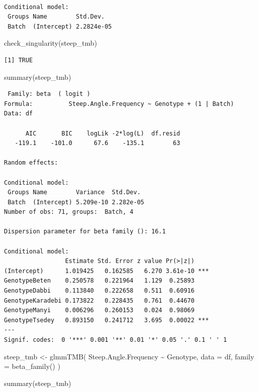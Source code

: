 \documentclass[
  letterpaper,
  DIV=11,
  numbers=noendperiod]{scrartcl}
\newenvironment{Shaded}{\begin{snugshade}}{\end{snugshade}}
\newcommand{\AttributeTok}[1]{\textcolor[rgb]{0.40,0.45,0.13}{#1}}
\newcommand{\FunctionTok}[1]{\textcolor[rgb]{0.28,0.35,0.67}{#1}}
\newcommand{\NormalTok}[1]{\textcolor[rgb]{0.00,0.23,0.31}{#1}}
\newcommand{\OtherTok}[1]{\textcolor[rgb]{0.00,0.23,0.31}{#1}}
\newcommand{\SpecialCharTok}[1]{\textcolor[rgb]{0.37,0.37,0.37}{#1}}
\begin{document}
\begin{verbatim}

Conditional model:
 Groups Name        Std.Dev.  
 Batch  (Intercept) 2.2824e-05
\end{verbatim}

\begin{Shaded}
\begin{Highlighting}[]
\FunctionTok{check\_singularity}\NormalTok{(steep\_tmb)}
\end{Highlighting}
\end{Shaded}

\begin{verbatim}
[1] TRUE
\end{verbatim}

\begin{Shaded}
\begin{Highlighting}[]
\FunctionTok{summary}\NormalTok{(steep\_tmb)}
\end{Highlighting}
\end{Shaded}

\begin{verbatim}
 Family: beta  ( logit )
Formula:          Steep.Angle.Frequency ~ Genotype + (1 | Batch)
Data: df

      AIC       BIC    logLik -2*log(L)  df.resid 
   -119.1    -101.0      67.6    -135.1        63 

Random effects:

Conditional model:
 Groups Name        Variance  Std.Dev. 
 Batch  (Intercept) 5.209e-10 2.282e-05
Number of obs: 71, groups:  Batch, 4

Dispersion parameter for beta family (): 16.1 

Conditional model:
                 Estimate Std. Error z value Pr(>|z|)    
(Intercept)      1.019425   0.162585   6.270 3.61e-10 ***
GenotypeBeten    0.250578   0.221964   1.129  0.25893    
GenotypeDabbi    0.113840   0.222658   0.511  0.60916    
GenotypeKaradebi 0.173822   0.228435   0.761  0.44670    
GenotypeManyi    0.006296   0.260153   0.024  0.98069    
GenotypeTsedey   0.893150   0.241712   3.695  0.00022 ***
---
Signif. codes:  0 '***' 0.001 '**' 0.01 '*' 0.05 '.' 0.1 ' ' 1
\end{verbatim}

\begin{Shaded}
\begin{Highlighting}[]
\NormalTok{steep\_tmb }\OtherTok{\textless{}{-}} \FunctionTok{glmmTMB}\NormalTok{(}
\NormalTok{  Steep.Angle.Frequency }\SpecialCharTok{\textasciitilde{}}\NormalTok{ Genotype,}
  \AttributeTok{data =}\NormalTok{ df, }\AttributeTok{family =} \FunctionTok{beta\_family}\NormalTok{()}
\NormalTok{)}

\FunctionTok{summary}\NormalTok{(steep\_tmb)}
\end{Highlighting}
\end{Shaded}
\end{document}
